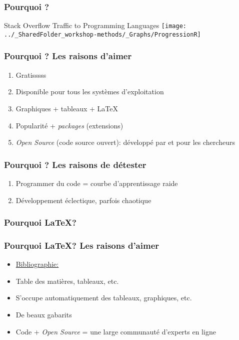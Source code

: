 \documentclass{beamer}
\begin{document}
     \begin{frame}
        \frametitle{Pourquoi \R?}  \vspace{1.2cm}
        \begin{center}
            Stack Overflow Traffic to Programming Languages
            \texttt{[image: ../\_SharedFolder\_workshop-methods/\_Graphs/ProgressionR]}
        \end{center} 
    \end{frame}

   \begin{frame}
        \frametitle{Pourquoi \R? Les raisons d'aimer}
        \begin{enumerate}
            \item{Gratisssss}
            \item{Disponible pour tous les systèmes d'exploitation}
            \item{Graphiques + tableaux + \LaTeX}
            \item{Popularité + \emph{packages} (extensions)}
            \item{\emph{Open Source} (code source ouvert): développé par et pour les chercheurs}
        \end{enumerate}
    \end{frame}
    
    \begin{frame}
        \frametitle{Pourquoi \R? Les raisons de détester}
        \begin{enumerate}
            \item{Programmer du code = courbe d'apprentissage raide}
            \item{Développement éclectique, parfois chaotique}
        \end{enumerate}
    \end{frame}
    


    \begin{frame}
        \frametitle{Pourquoi \LaTeX?} \vspace{1cm}   
    \end{frame}
    
    \begin{frame}
        \frametitle{Pourquoi \LaTeX? Les raisons d'aimer} \vspace{1cm}
        \begin{itemize}
           \item{\href{https://scholar.google.ca}{Bibliographie: \BibTeX}}
           \item{Table des matières, tableaux, etc.}
           \item{S'occupe automatiquement des tableaux, graphiques, etc.}
           \item{De beaux gabarits}
           \item{Code + \emph{Open Source} = une large communauté d'experts en ligne}
        \end{itemize} 
    \end{frame}
    
\end{document}

